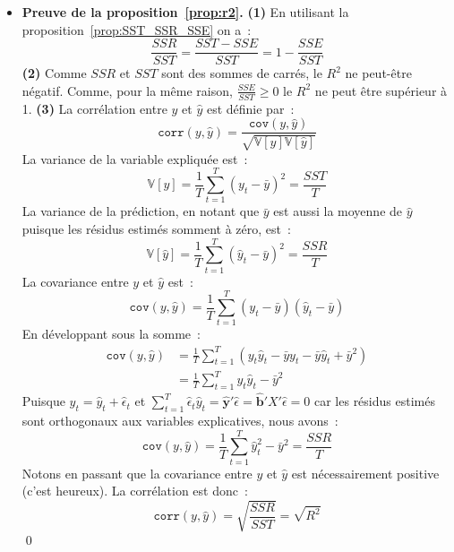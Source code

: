 \documentclass[10pt,a4paper]{article}
\theoremstyle{definition}
\renewcommand{\newline}{\unskip\par\vspace{1.5pt}}
\begin{document}
\begin{notes}
  \begin{itemize}
  \item \textbf{Preuve de la proposition~\ref{prop:r2}.} \textbf{(1)} En utilisant la proposition~\ref{prop:SST_SSR_SSE} on a~:
    \[
      \frac{SSR}{SST} = \frac{SST-SSE}{SST} = 1 - \frac{SSE}{SST}
    \]
    \textbf{(2)} Comme $SSR$ et $SST$ sont des sommes de carrés, le $R^2$ ne peut-être négatif. Comme, pour la même raison, $\frac{SSE}{SST}\geq 0$ le $R^2$ ne peut être supérieur à 1. \textbf{(3)} La corrélation entre $y$ et $\hat y$ est définie par~:
    \[
      \mathtt{corr}(y,\hat y) = \frac{\mathtt{cov}(y,\hat y)}{\sqrt{\mathbb V[y]\mathbb V[\hat y]}}
    \]
    La variance de la variable expliquée est~:
    \[
      \mathbb V [y] = \frac{1}{T}\sum_{t=1}^T(y_t-\bar y)^2 = \frac{SST}{T}
    \]
    La variance de la prédiction, en notant que $\bar y$ est aussi la moyenne de $\hat y$ puisque les résidus estimés somment à zéro, est~:
    \[
      \mathbb V [\hat y] = \frac{1}{T}\sum_{t=1}^T(\hat y_t-\bar y)^2 = \frac{SSR}{T}
    \]
    La covariance entre $y$ et $\hat y$ est~:
    \[
      \mathtt{cov}(y,\hat y) = \frac{1}{T}\sum_{t=1}^T(y_t-\bar y)(\hat y_t- \bar y)
    \]
    En développant sous la somme~:
    \[
      \begin{split}
        \mathtt{cov}(y,\hat y) &= \frac{1}{T}\sum_{t=1}^T \left(y_t\hat y_t - \bar y y_t - \bar y \hat y_t + \bar y^2\right)\\
                               &= \frac{1}{T}\sum_{t=1}^T y_t\hat y_t - \bar y^2
      \end{split}
    \]
    Puisque $y_t = \hat y_t + \hat \epsilon_t$ et $\sum_{t=1}^T\hat \epsilon_t \hat y_t  = \hat{\mathbf y}'\hat\epsilon = \hat{\mathbf b}'X'\hat\epsilon = 0$ car les résidus estimés sont orthogonaux aux variables explicatives, nous avons~:
    \[
      \mathtt{cov}(y,\hat y) = \frac{1}{T}\sum_{t=1}^T\hat y_t^2 - \bar y^2 = \frac{SSR}{T}
    \]
    Notons en passant que la covariance entre $y$ et $\hat y$ est nécessairement positive (c'est heureux). La corrélation est donc~:
    \[
      \mathtt{corr}(y,\hat y) = \sqrt{\frac{SSR}{SST}} = \sqrt{R^2}
    \]
    \qed\newline
  \end{itemize}
\end{notes}
\end{document}
